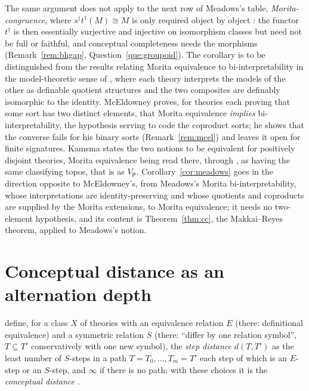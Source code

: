 \documentclass[11pt]{amsart}
\theoremstyle{definition}
\newcommand{\PP}{\mathsf P}
\begin{document}
The same argument does not apply to the next row of Meadows's table,
\emph{Morita-congruence}, where $s^\dagger t^\dagger(M)\cong M$ is only
required object by object \cite[Def.~44(3)]{Meadows24}: the functor
$t^\dagger$ is then essentially surjective and injective on isomorphism
classes but need not be full or faithful, and conceptual completeness
needs the morphisms (Remark~\ref{rem:bhgap}, Question~\ref{que:groupoid}).
The corollary is to be distinguished from the results relating Morita
equivalence to bi-interpretability in the model-theoretic sense of
\cite[Def.~5.5]{McEl20}, where each theory interprets the models of the
other as definable quotient structures and the two composites are
definably isomorphic to the identity. McEldowney
\cite[Prop.~5.11]{McEl20} proves, for theories each proving that some
sort has two distinct elements, that Morita equivalence \emph{implies}
bi-interpretability, the hypothesis serving to code the coproduct
sorts; he shows that the converse fails for his binary sorts
(Remark~\ref{rem:mcel}) and leaves it open for finite signatures.
Kamsma \cite[Fact~8.6]{Kamsma23} states the two notions to be
equivalent for positively disjoint theories, Morita equivalence being
read there, through \cite{Tsem17}, as having the same classifying
topos, that is as $V_\PP$. Corollary~\ref{cor:meadows} goes in the
direction opposite to McEldowney's, from Meadows's Morita
bi-interpretability, whose interpretations are identity-preserving and
whose quotients and coproducts are supplied by the Morita extensions,
to Morita equivalence; it needs no two-element hypothesis, and its
content is Theorem~\ref{thm:cc}, the Makkai--Reyes theorem, applied to
Meadows's notion.

\section{Conceptual distance as an alternation depth}\label{sec:distance}

\cite{KSLF20} define, for a class $X$ of theories with an equivalence
relation $E$ (there: definitional equivalence) and a symmetric relation
$S$ (there: ``differ by one relation symbol'', $T\subseteq T'$
conservatively with one new symbol), the \emph{step distance} $d(T,T')$
as the least number of $S$-steps in a path $T=T_0,\dots,T_m=T'$ each
step of which is an $E$-step or an $S$-step, and $\infty$ if there is no
path; with these choices it is the \emph{conceptual distance}
\cite[Def.~4.4--4.5]{KSLF20}.
\end{document}
